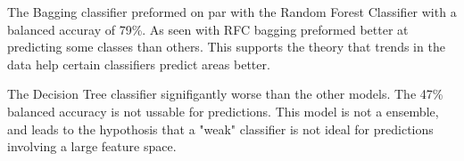 \par
The Bagging classifier preformed on par with the Random Forest Classifier with a balanced accuray of 79\%.
As seen with \ac{RFC} bagging preformed better at predicting some classes than others.
This supports the theory that trends in the data help certain classifiers predict areas better.

\par
The Decision Tree classifier signifigantly worse than the other models.
The 47\% balanced accuracy is not ussable for predictions.
This model is not a ensemble, and leads to the hypothosis that a "weak" classifier is not ideal for predictions involving a large feature space.